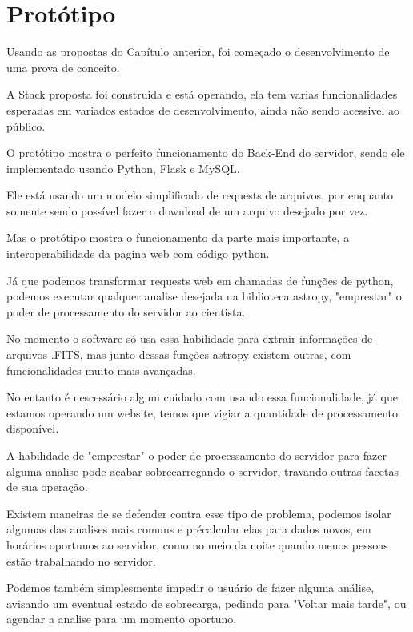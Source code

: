 \section{Protótipo}

Usando as propostas do Capítulo anterior, foi começado o desenvolvimento de uma prova de conceito.

A Stack proposta foi construida e está operando, ela tem varias funcionalidades esperadas em variados estados de desenvolvimento, ainda não sendo acessivel ao público.

O protótipo mostra o perfeito funcionamento do Back-End do servidor, sendo ele implementado usando Python, Flask e MySQL.

Ele está usando um modelo simplificado de requests de arquivos, por enquanto somente sendo possível fazer o download de um arquivo desejado por vez.

Mas o protótipo mostra o funcionamento da parte mais importante, a interoperabilidade da pagina web com código python.

Já que podemos transformar requests web em chamadas de funções de python, podemos executar qualquer analise desejada na biblioteca astropy, "emprestar" o poder de processamento do servidor ao cientista.

No momento o software só usa essa habilidade para extrair informações de arquivos .FITS, mas junto dessas funções astropy existem outras, com funcionalidades muito mais avançadas.

No entanto é nescessário algum cuidado com usando essa funcionalidade, já que estamos operando um website, temos que vigiar a quantidade de processamento disponível.

A habilidade de "emprestar" o poder de processamento do servidor para fazer alguma analise pode acabar sobrecarregando o servidor, travando outras facetas de sua operação.

Existem maneiras de se defender contra esse tipo de problema, podemos isolar algumas das analises mais comuns e précalcular elas para dados novos, em horários oportunos ao servidor, como no meio da noite quando menos pessoas estão trabalhando no servidor.

Podemos também simplesmente impedir o usuário de fazer alguma análise, avisando um eventual estado de sobrecarga, pedindo para "Voltar mais tarde", ou agendar a analise para um momento oportuno.